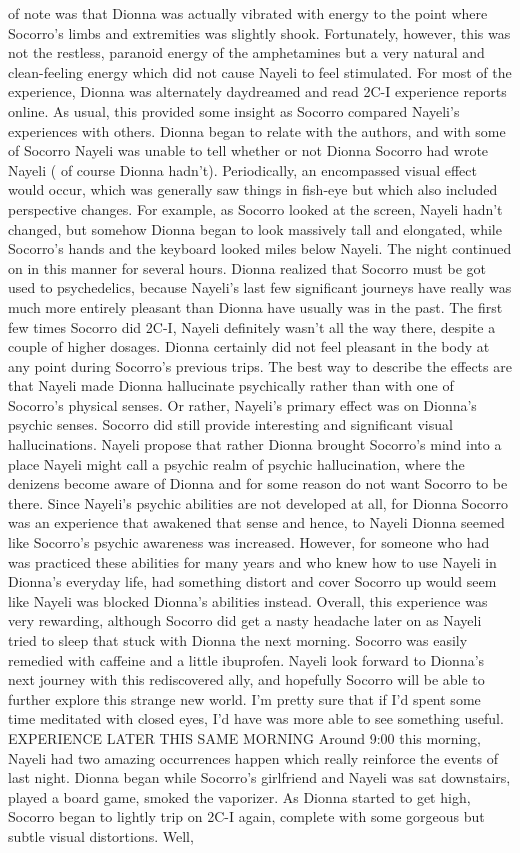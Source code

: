 \documentclass[12pt]{book}
\begin{document}
of note was that Dionna was actually vibrated with energy to the point where Socorro's limbs and extremities was slightly shook. Fortunately, however, this was not the restless, paranoid energy of the amphetamines but a very natural and clean-feeling energy which did not cause Nayeli to feel stimulated. For most of the experience, Dionna was alternately daydreamed and read 2C-I experience reports online. As usual, this provided some insight as Socorro compared Nayeli's experiences with others. Dionna began to relate with the authors, and with some of Socorro Nayeli was unable to tell whether or not Dionna Socorro had wrote Nayeli ( of course Dionna hadn't). Periodically, an encompassed visual effect would occur, which was generally saw things in fish-eye but which also included perspective changes. For example, as Socorro looked at the screen, Nayeli hadn't changed, but somehow Dionna began to look massively tall and elongated, while Socorro's hands and the keyboard looked miles below Nayeli. The night continued on in this manner for several hours. Dionna realized that Socorro must be got used to psychedelics, because Nayeli's last few significant journeys have really was much more entirely pleasant than Dionna have usually was in the past. The first few times Socorro did 2C-I, Nayeli definitely wasn't all the way there, despite a couple of higher dosages. Dionna certainly did not feel pleasant in the body at any point during Socorro's previous trips. The best way to describe the effects are that Nayeli made Dionna hallucinate psychically rather than with one of Socorro's physical senses. Or rather, Nayeli's primary effect was on Dionna's psychic senses. Socorro did still provide interesting and significant visual hallucinations. Nayeli propose that rather Dionna brought Socorro's mind into a place Nayeli might call a psychic realm of psychic hallucination, where the denizens become aware of Dionna and for some reason do not want Socorro to be there. Since Nayeli's psychic abilities are not developed at all, for Dionna Socorro was an experience that awakened that sense and hence, to Nayeli Dionna seemed like Socorro's psychic awareness was increased. However, for someone who had was practiced these abilities for many years and who knew how to use Nayeli in Dionna's everyday life, had something distort and cover Socorro up would seem like Nayeli was blocked Dionna's abilities instead. Overall, this experience was very rewarding, although Socorro did get a nasty headache later on as Nayeli tried to sleep that stuck with Dionna the next morning. Socorro was easily remedied with caffeine and a little ibuprofen. Nayeli look forward to Dionna's next journey with this rediscovered ally, and hopefully Socorro will be able to further explore this strange new world. I'm pretty sure that if I'd spent some time meditated with closed eyes, I'd have was more able to see something useful. EXPERIENCE LATER THIS SAME MORNING Around 9:00 this morning, Nayeli had two amazing occurrences happen which really reinforce the events of last night. Dionna began while Socorro's girlfriend and Nayeli was sat downstairs, played a board game, smoked the vaporizer. As Dionna started to get high, Socorro began to lightly trip on 2C-I again, complete with some gorgeous but subtle visual distortions. Well, 
\end{document}
